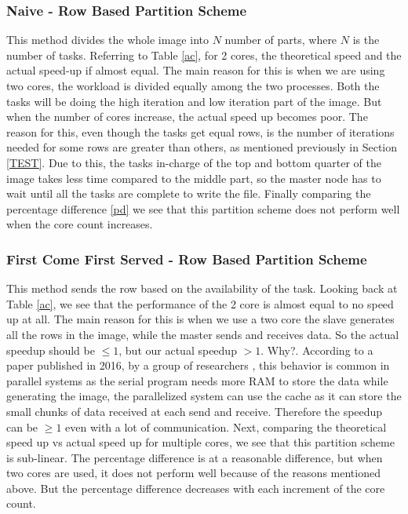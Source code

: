\documentclass[conference]{IEEEtran}
\begin{document}
	\subsubsection{Naive - Row Based Partition Scheme }
	\label{naiveres}
	This method divides the whole image into $N$ number of parts, where $N$ is the number of tasks.
	Referring to Table \ref{ac}, for 2 cores, the theoretical speed and the actual speed-up if almost equal. The main reason for this is when we are using two cores, the workload is divided equally among the two processes. Both the tasks will be doing the high iteration and low iteration part of the image.
	But when the number of cores increase, the actual speed up becomes poor. The reason for this, even though the tasks get equal rows, is the number of iterations needed for some rows are greater than others, as mentioned previously in Section \ref{TEST}. Due to this, the tasks in-charge of the top and bottom quarter of the image takes less time compared to the middle part, so the master node has to wait until all the tasks are complete to write the file. Finally comparing the percentage difference \ref{pd} we see that this partition scheme does not perform well when the core count increases.
	
	\subsubsection{First Come First Served - Row Based Partition Scheme}
	This method sends the row based on the availability of the task. Looking back at Table \ref{ac}, we see that the performance of the 2 core is almost equal to no speed up at all. The main reason for this is when we use a two core the slave generates all the rows in the image, while the master sends and receives data. So the actual speedup should be $ \le 1$, but our actual speedup $> 1$. Why?. According to a paper published in 2016, by a group of researchers \cite{ristov2016superlinear}, this behavior is common in parallel systems as the serial program needs more RAM to store the data while generating the image, the parallelized system can use the cache as it can store the small chunks of data received at each send and receive. Therefore the speedup can be $\ge 1$ even with a lot of communication.	
	Next, comparing the theoretical speed up vs actual speed up for multiple cores, we see that this partition scheme is sub-linear. The percentage difference is at a reasonable difference, but when two cores are used, it does not perform well because of the reasons mentioned above. But the percentage difference decreases with each increment of the core count.
	
\end{document}
